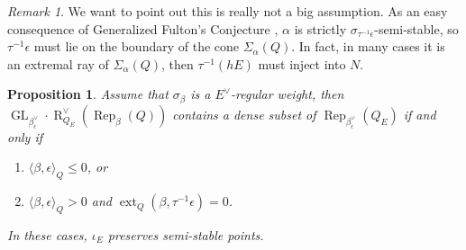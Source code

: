 \documentclass{amsart}
\newtheorem{proposition}[theorem]{Proposition}
\theoremstyle{definition}
\theoremstyle{remark}
\newtheorem{remark}[theorem]{Remark}
\numberwithin{equation}{section}
\begin{document}
\begin{remark} We want to point out this is really not a big assumption.
As an easy consequence of Generalized Fulton's Conjecture \cite[Theorem 7.16]{DW2}, $\alpha$ is strictly $\sigma_{\tau^{-1}\epsilon}$-semi-stable, so $\tau^{-1}\epsilon$ must lie on the boundary of the cone $\Sigma_\alpha(Q)$. In fact, in many cases it is an extremal ray of $\Sigma_\alpha(Q)$, then $\tau^{-1}(hE)$ must inject into $N$.
\end{remark}

\begin{proposition} \label{P:sspreserve} Assume that $\sigma_\beta$ is a $E^\vee$-regular weight, then
${\operatorname{GL}}_{\beta_\epsilon^\vee}\cdot{\operatorname{R}}_{Q_E}^\vee({\operatorname{Rep}}_\beta(Q))$ contains a dense subset of ${\operatorname{Rep}}_{\beta_\epsilon^\vee}(Q_E)$ if and only if \begin{enumerate}
\item[(i)] ${\langle{\beta,\epsilon}\rangle}_Q\leqslant 0$, or
\item[(ii)] ${\langle{\beta,\epsilon}\rangle}_Q>0$ and ${\operatorname{ext}}_Q(\beta,\tau^{-1}\epsilon)=0$.
\end{enumerate}
In these cases, $\iota_E$ preserves semi-stable points.
\end{proposition}
\end{document}
